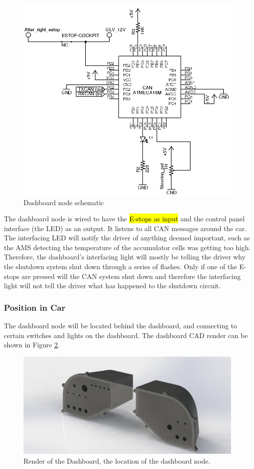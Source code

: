 \documentclass{article}
\DeclareRobustCommand{\hlr}[1]{{\sethlcolor{red}\hl{#1}}}
\begin{document}
            \begin{figure}[H]
                \centering
                \includegraphics[width = 0.8 \textwidth]{CANdashboard}
                \caption{Dashboard node schematic}
                \label{dashschem}
            \end{figure}

            The dashboard node is wired to have the \hlr{E-stops as input} and the control panel interface (the LED) as an output. It listens to all CAN messages around the car. The interfacing LED will notify the driver of anything deemed important, such as the AMS detecting the temperature of the accumulator cells was getting too high. Therefore, the dashboard's interfacing light will mostly be telling the driver why the shutdown system shut down through a series of flashes. Only if one of the E-stops are pressed will the CAN system shut down and therefore the interfacing light will not tell the driver what has happened to the shutdown circuit.

        \subsubsection{Position in Car}

            The dashboard node will be located behind the dashboard, and connecting to certain switches and lights on the dashboard. The dashboard CAD render can be shown in Figure \ref{dashboard}.

            \begin{figure}[H]
            \centering
            \includegraphics[width = 0.7 \textwidth]{Dashboard}
            \caption{Render of the Dashboard, the location of the dashboard node. }
            \label{dashboard}
            \end{figure}
\end{document}
